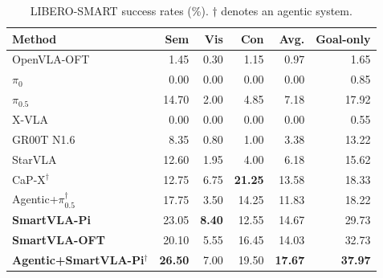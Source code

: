\begin{table}[htbp]
\centering
\setlength{\abovecaptionskip}{0pt}
\setlength{\belowcaptionskip}{\baselineskip}
\caption{LIBERO-SMART success rates (\%). $\dagger$ denotes an agentic system.}
\label{tab:libero-smart}
\label{tab:agentic-smart}
\nointerlineskip
\normalsize
\setlength{\tabcolsep}{3.6pt}
\begin{tabular}{@{}lrrrrr@{}}
\toprule
Method & Sem & Vis & Con & Avg. & Goal-only \\
\midrule
OpenVLA-OFT & 1.45 & 0.30 & 1.15 & 0.97 & 1.65 \\
$\pi_{0}$ & 0.00 & 0.00 & 0.00 & 0.00 & 0.85 \\
$\pi_{0.5}$ & 14.70 & 2.00 & 4.85 & 7.18 & 17.92 \\
X-VLA & 0.00 & 0.00 & 0.00 & 0.00 & 0.55 \\
GR00T N1.6 & 8.35 & 0.80 & 1.00 & 3.38 & 13.22 \\
StarVLA & 12.60 & 1.95 & 4.00 & 6.18 & 15.62 \\
CaP-X$^\dagger$ & 12.75 & 6.75 & \textbf{21.25} & 13.58 & 18.33 \\
Agentic+$\pi_{0.5}^{\dagger}$ & 17.75 & 3.50 & 14.25 & 11.83 & 18.22 \\
\midrule
\rowcolor{smartvlarow}
\textbf{SmartVLA-Pi} & 23.05 & \textbf{8.40} & 12.55 & 14.67 & 29.73 \\
\rowcolor{smartvlarow}
\textbf{SmartVLA-OFT} & 20.10 & 5.55 & 16.45 & 14.03 & 32.73 \\
\rowcolor{smartvlarow}
\textbf{Agentic+SmartVLA-Pi$^\dagger$} & \textbf{26.50} & 7.00 & 19.50 & \textbf{17.67} & \textbf{37.97} \\
\bottomrule
\end{tabular}
\end{table}

